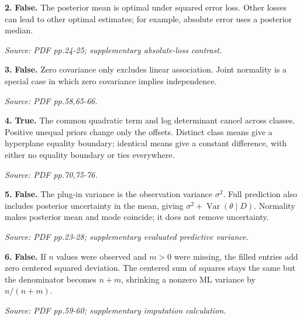 \documentclass[11pt,a4paper]{article}
\begin{document}
\par\noindent\begin{minipage}{\linewidth}
\textbf{2.} \textbf{False.} The posterior mean is optimal under squared error loss. Other losses can lead to other optimal estimates; for example, absolute error uses a posterior median.

{\footnotesize\textit{Source: PDF pp.24-25; supplementary absolute-loss contrast.}}
\end{minipage}\par\vspace{3mm}
\par\noindent\begin{minipage}{\linewidth}
\textbf{3.} \textbf{False.} Zero covariance only excludes linear association. Joint normality is a special case in which zero covariance implies independence.

{\footnotesize\textit{Source: PDF pp.58,65-66.}}
\end{minipage}\par\vspace{3mm}
\par\noindent\begin{minipage}{\linewidth}
\textbf{4.} \textbf{True.} The common quadratic term and log determinant cancel across classes. Positive unequal priors change only the offsets. Distinct class means give a hyperplane equality boundary; identical means give a constant difference, with either no equality boundary or ties everywhere.

{\footnotesize\textit{Source: PDF pp.70,75-76.}}
\end{minipage}\par\vspace{3mm}
\par\noindent\begin{minipage}{\linewidth}
\textbf{5.} \textbf{False.} The plug-in variance is the observation variance \(\sigma^2\). Full prediction also includes posterior uncertainty in the mean, giving \(\sigma^2+\operatorname{Var}(\theta\mid D)\). Normality makes posterior mean and mode coincide; it does not remove uncertainty.

{\footnotesize\textit{Source: PDF pp.23-28; supplementary evaluated predictive variance.}}
\end{minipage}\par\vspace{3mm}
\par\noindent\begin{minipage}{\linewidth}
\textbf{6.} \textbf{False.} If \(n\) values were observed and \(m>0\) were missing, the filled entries add zero centered squared deviation. The centered sum of squares stays the same but the denominator becomes \(n+m\), shrinking a nonzero ML variance by \(n/(n+m)\).

{\footnotesize\textit{Source: PDF pp.59-60; supplementary imputation calculation.}}
\end{minipage}\par\vspace{3mm}
\end{document}
